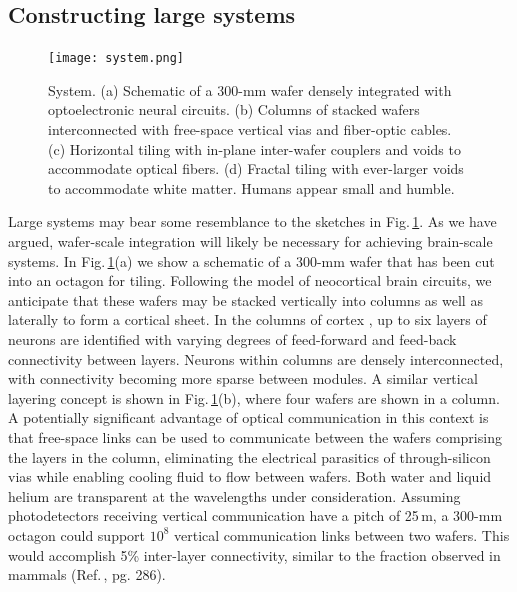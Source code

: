 \documentclass[twocolumn]{article}
\begin{document}
\subsection{Constructing large systems}
\begin{figure}
    \centering
    \texttt{[image: system.png]}
    \caption{System. (a) Schematic of a 300-mm wafer densely integrated with optoelectronic neural circuits. (b) Columns of stacked wafers interconnected with free-space vertical vias and fiber-optic cables. (c) Horizontal tiling with in-plane inter-wafer couplers and voids to accommodate optical fibers. (d) Fractal tiling with ever-larger voids to accommodate white matter. Humans appear small and humble.}
    \label{fig:system}
\end{figure}
Large systems may bear some resemblance to the sketches in Fig.\,\ref{fig:system}. As we have argued, wafer-scale integration will likely be necessary for achieving brain-scale systems. In Fig.\,\ref{fig:system}(a) we show a schematic of a 300-mm wafer that has been cut into an octagon for tiling. Following the model of neocortical brain circuits, we anticipate that these wafers may be stacked vertically into columns as well as laterally to form a cortical sheet. In the columns of cortex \cite{mo1978,mo1997}, up to six layers of neurons are identified with varying degrees of feed-forward and feed-back connectivity between layers. Neurons within columns are densely interconnected, with connectivity becoming more sparse between modules. A similar vertical layering concept is shown in Fig.\,\ref{fig:system}(b), where four wafers are shown in a column. A potentially significant advantage of optical communication in this context is that free-space links can be used to communicate between the wafers comprising the layers in the column, eliminating the electrical parasitics of through-silicon vias while enabling cooling fluid to flow between wafers. Both water and liquid helium are transparent at the wavelengths under consideration. Assuming photodetectors receiving vertical communication have a pitch of 25\,\textmu m, a 300-mm octagon could support $10^8$ vertical communication links between two wafers. This would accomplish 5\% inter-layer connectivity, similar to the fraction observed in mammals (Ref.\,, pg. 286).
\end{document}
